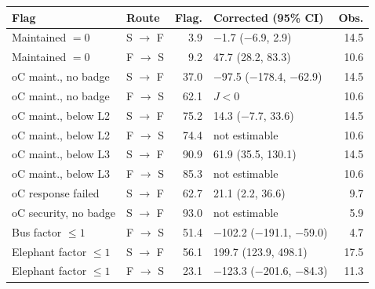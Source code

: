 \begin{tabular}{llrlr}
\toprule
Flag & Route & Flag. & Corrected (95\% CI) & Obs. \\
\midrule
Maintained $=0$ & S $\to$ F & 3.9 & $-$1.7 ($-$6.9, 2.9) & 14.5 \\
Maintained $=0$ & F $\to$ S & 9.2 & 47.7 (28.2, 83.3) & 10.6 \\
oC maint., no badge & S $\to$ F & 37.0 & $-$97.5 ($-$178.4, $-$62.9) & 14.5 \\
oC maint., no badge & F $\to$ S & 62.1 & $J<0$ & 10.6 \\
oC maint., below L2 & S $\to$ F & 75.2 & 14.3 ($-$7.7, 33.6) & 14.5 \\
oC maint., below L2 & F $\to$ S & 74.4 & not estimable & 10.6 \\
oC maint., below L3 & S $\to$ F & 90.9 & 61.9 (35.5, 130.1) & 14.5 \\
oC maint., below L3 & F $\to$ S & 85.3 & not estimable & 10.6 \\
oC response failed & S $\to$ F & 62.7 & 21.1 (2.2, 36.6) & 9.7 \\
oC security, no badge & S $\to$ F & 93.0 & not estimable & 5.9 \\
Bus factor $\leq 1$ & F $\to$ S & 51.4 & $-$102.2 ($-$191.1, $-$59.0) & 4.7 \\
Elephant factor $\leq 1$ & S $\to$ F & 56.1 & 199.7 (123.9, 498.1) & 17.5 \\
Elephant factor $\leq 1$ & F $\to$ S & 23.1 & $-$123.3 ($-$201.6, $-$84.3) & 11.3 \\
\bottomrule
\end{tabular}
